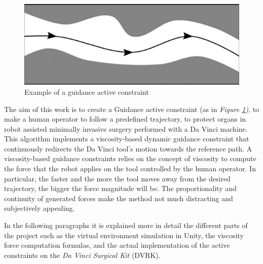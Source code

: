 \documentclass[conference]{IEEEtran}
\begin{document}
    \begin{figure}[h]
        \centering
        \includegraphics{intro2.png}
        \caption{Example of a guidance active constraint}
        \label{fig:intro2}
    \end{figure}
    The aim of this work is to create a Guidance active constraint (as in
    \textit{Figure \ref{fig:intro2})}, to make a human operator to follow
    a predefined trajectory, to protect organs in robot assisted minimally
    invasive surgery performed with a Da Vinci machine. This algorithm
    implements a viscosity-based dynamic guidance constraint that
    continuously redirects the Da Vinci tool’s motion towards the
    reference path. A viscosity-based guidance constraints relies on the
    concept of viscosity to compute the force that the robot applies on
    the tool controlled by the human operator. In particular, the faster
    and the more the tool moves away from the desired trajectory, the
    bigger the force magnitude will be. The proportionality and continuity
    of generated forces make the method not much distracting and
    subjectively appealing.

    In the following paragraphs it is explained more in detail the
    different parts of the project such as the virtual environment
    simulation in Unity, the viscosity force computation formulas, and the
    actual implementation of the active constraints on the \textit{Da
    Vinci Surgical Kit} (DVRK).
\end{document}
